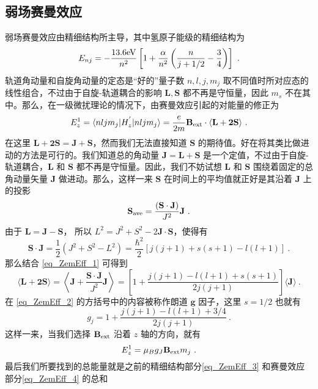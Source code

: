 \subsection{弱场赛曼效应}
弱场赛曼效应由精细结构所主导，其中氢原子能级的精细结构为
\begin{equation}\label{eq_ZemEff_3}
E_{nj}=-\frac{13.6\rm{eV}}{n^2}\left[1+\frac{\alpha}{n^2}\left(\frac{n}{j+1/2}-\frac{3}{4}\right)\right]~.
\end{equation}
轨道角动量和自旋角动量的定态是“好的”量子数 $n,l,j,m_j$ 取不同值时所对应态的线性组合，不过由于自旋-轨道耦合的影响 $\mathbf{L,S}$ 都不再是守恒量，因此 $m_s$ 不在其中。那么，在一级微扰理论的情况下，由赛曼效应引起的对能量的修正为
$$
E_z^{1}=\langle nljm_j|H_z^{'}|nljm_j\rangle=\frac{e}{2m}\mathbf{B}_{\rm{ext}}\cdot\langle\mathbf{L+2S}\rangle~.
$$
在这里 $\mathbf{L+2S=J+S}$，然而我们无法直接知道 $\mathbf{S}$ 的期待值。好在将其类比做进动的方法是可行的。我们知道总的角动量 $\mathbf{J=L+S}$ 是一个定值，不过由于自旋-轨道耦合，$\mathbf{L}$ 和 $\mathbf{S}$ 都不再是守恒量。因此，我们不妨试想 $\mathbf{L}$ 和 $\mathbf{S}$ 围绕着固定的总角动量矢量 $\mathbf{J}$ 做进动。那么，这样一来 $\mathbf{S}$ 在时间上的平均值就正好是其沿着 $\mathbf{J}$ 上的投影
\begin{equation}\label{eq_ZemEff_1}
\mathbf{S}_{\rm{ave}}=\frac{(\mathbf{S\cdot J})}{J^2}\mathbf{J}~.
\end{equation}
由于 $\mathbf{L=J-S}$， 所以 $L^2=J^2+S^2-2\mathbf{J\cdot S}$，使得有
\begin{equation}
\mathbf{S\cdot J}=\frac{1}{2}(J^2+S^2-L^2)=\frac{\hbar^2}{2}[j(j+1)+s(s+1)-l(l+1)]~.
\end{equation}
那么结合 \autoref{eq_ZemEff_1} 可得到
\begin{equation}\label{eq_ZemEff_2}
\langle \mathbf{L+2S}\rangle =\left\langle \mathbf{J}+\frac{\mathbf{S\cdot J}}{J^2}\mathbf{J}\right\rangle=\left[1+\frac{j(j+1)-l(l+1)+s(s+1)}{2j(j+1)}\right]\langle\mathbf{J}\rangle~.
\end{equation}
在 \autoref{eq_ZemEff_2} 的方括号中的内容被称作朗道 $\mathbf{g}$ 因子，这里 $s=1/2$ 也就有
\begin{equation}\label{eq_ZemEff_15}
g_j=1+\frac{j(j+1)-l(l+1)+3/4}{2j(j+1)}~.
\end{equation}
这样一来，当我们选择 $\mathbf{B}_{\rm{ext}}$ 沿着 $z$ 轴的方向，就有
\begin{equation}\label{eq_ZemEff_4}
E^1_z =\mu_Bg_J\mathbf{B}_{\rm{ext}}m_j~.
\end{equation}
最后我们所要找到的总能量就是之前的精细结构部分\autoref{eq_ZemEff_3} 和赛曼效应部分\autoref{eq_ZemEff_4} 的总和
